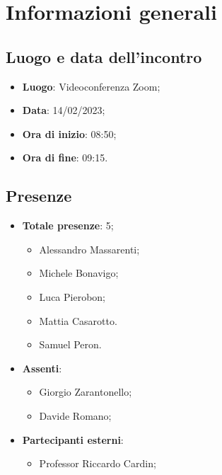 \section{Informazioni generali}

    \subsection{Luogo e data dell'incontro}
    \begin{itemize}
        \item \textbf{Luogo}: Videoconferenza Zoom;
        \item \textbf{Data}: 14/02/2023;
        \item \textbf{Ora di inizio}: 08:50;
        \item \textbf{Ora di fine}: 09:15.
    \end{itemize}
    \subsection{Presenze}
    \begin{itemize}
        \item \textbf{Totale presenze}: 5;
        \begin{itemize}
            \item Alessandro Massarenti;
            \item Michele Bonavigo;
            \item Luca Pierobon;
            \item Mattia Casarotto.
            \item Samuel Peron.
        \end{itemize}
        \item \textbf{Assenti}:
        \begin{itemize}
            \item Giorgio Zarantonello;
            \item Davide Romano;
        \end{itemize}
        \item \textbf{Partecipanti esterni}:
        \begin{itemize}
            \item Professor Riccardo Cardin;
        \end{itemize}
    \end{itemize}